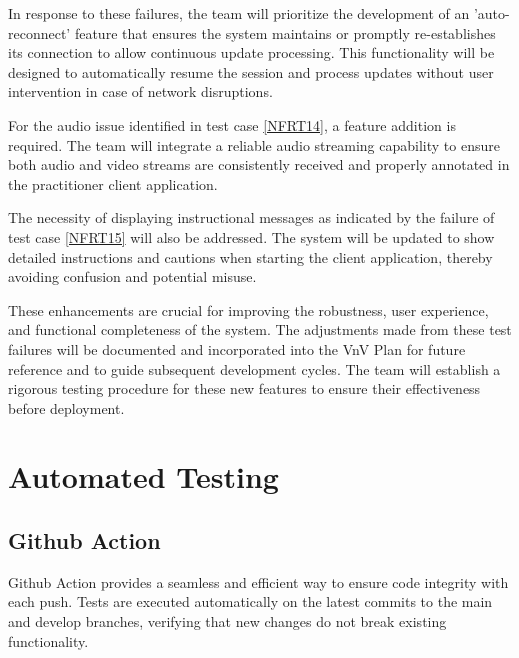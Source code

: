 \documentclass[12pt, titlepage]{article}
\begin{document}
In response to these failures, the team will prioritize the development of an
'auto-reconnect' feature that ensures the system maintains or promptly
re-establishes its connection to allow continuous update processing. This
functionality will be designed to automatically resume the session and process
updates without user intervention in case of network disruptions.

For the audio issue identified in test case \ref{NFRT14}, a feature addition is
required. The team will integrate a reliable audio streaming capability to
ensure both audio and video streams are consistently received and properly
annotated in the practitioner client application.

The necessity of displaying instructional messages as indicated by the failure
of test case \ref{NFRT15} will also be addressed. The system will be updated to
show detailed instructions and cautions when starting the client application,
thereby avoiding confusion and potential misuse.

These enhancements are crucial for improving the robustness, user experience,
and functional completeness of the system. The adjustments made from these test
failures will be documented and incorporated into the VnV Plan for future
reference and to guide subsequent development cycles. The team will establish a
rigorous testing procedure for these new features to ensure their effectiveness
before deployment.

\section{Automated Testing}

\subsection{Github Action}

Github Action provides a seamless and efficient way to ensure code integrity
with each push. Tests are executed automatically on the latest commits to the
main and develop branches, verifying that new changes do not break existing
functionality.
\end{document}
